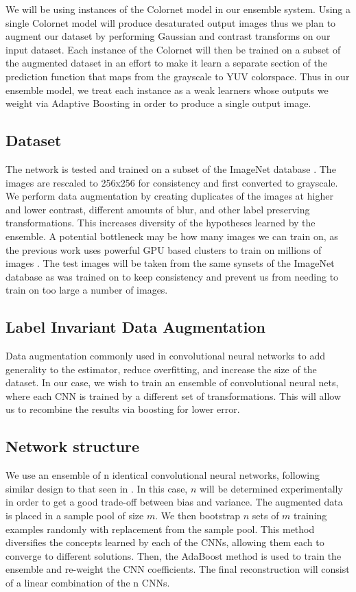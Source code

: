\documentclass[10pt,twocolumn,letterpaper]{article}
\begin{document}
We will be using instances of the Colornet\cite{ColorNet} model in  our ensemble system. Using a single Colornet model will produce desaturated output images thus we plan to augment our dataset by performing Gaussian and contrast transforms on our input dataset. Each instance of the Colornet will then be trained on a subset of the augmented dataset in an effort to make it learn a separate section of the prediction function that maps from the grayscale to YUV colorspace. Thus in our ensemble model, we treat each instance as a weak learners whose outputs we weight via Adaptive Boosting in order to produce a single output image.

\subsection{Dataset}
The network is tested and trained on a subset of the ImageNet database \cite{Russakovsky2015}. The images are rescaled to 256x256 for consistency and first converted to grayscale. We perform data augmentation by creating duplicates of the images at higher and lower contrast, different amounts of blur, and other label preserving transformations. This increases diversity of the hypotheses learned by the ensemble. A potential bottleneck may be how many images we can train on, as the previous work uses powerful GPU based clusters to train on millions of images \cite{Hariharan2015, DeepColorization}. The test images will be taken from the same synsets of the ImageNet database as was trained on to keep consistency and prevent us from needing to train on too large a number of images.

\subsection{Label Invariant Data Augmentation}
Data augmentation commonly used in convolutional neural networks to add generality to the estimator, reduce overfitting, and increase the size of the dataset. In our case, we wish to train an ensemble of convolutional neural nets, where each CNN is trained by a different set of transformations. This will allow us to recombine the results via boosting for lower error.

\subsection{Network structure}
We use an ensemble of n identical convolutional neural networks, following similar design to that seen in \cite{Hariharan2015, DeepColorization}. In this case, $n$ will be determined experimentally in order to get a good trade-off between bias and variance. The augmented data is placed in a sample pool of size $m$. We then bootstrap $n$ sets of $m$ training examples randomly with replacement from the sample pool. This method diversifies the concepts learned by each of the CNNs, allowing them each to converge to different solutions. Then, the AdaBoost method is used to train the ensemble and re-weight the CNN coefficients. The final reconstruction will consist of a linear combination of the n CNNs.
\end{document}
